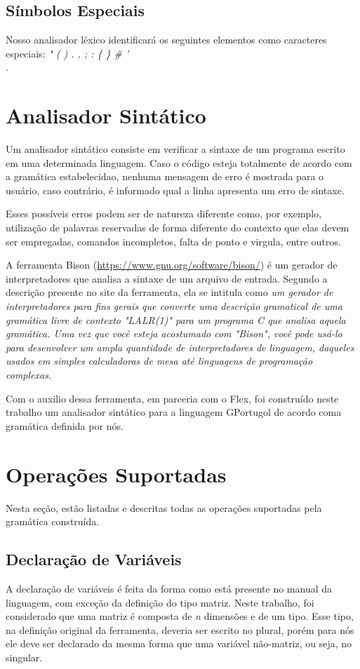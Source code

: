 \documentclass[
12pt,				%
a4paper,			%
english,			%
french,				%
spanish,			%
brazil,				%
article
]{abntex2}
\begin{document}
\subsection{Símbolos Especiais}
Nosso analisador léxico identificará os seguintes elementos como caracteres especiais: \textit{" ( ) . , ; : \{ \} \# ' \\}.


\section{Analisador Sintático}

Um analisador sintático consiste em verificar a sintaxe de um programa escrito em uma determinada linguagem. Caso o código esteja totalmente de acordo com a gramática estabelecidao, nenhuma mensagem de erro é mostrada para o usuário, caso contrário, é informado qual a linha apresenta um erro de sintaxe.

Esses possíveis erros podem ser de natureza diferente como, por exemplo, utilização de palavras reservadas de forma diferente do contexto que elas devem ser empregadas, comandos incompletos, falta de ponto e virgula, entre outros. 

A ferramenta Bison (\url{https://www.gnu.org/software/bison/}) é um gerador de interpretadores que analisa a sintaxe de um arquivo de entrada. Segundo a descrição presente no site da ferramenta, ela se intitula como \textit{um gerador de interpretadores para fins gerais que converte uma descrição gramatical de uma gramática livre de contexto "LALR(1)" para um programa C que analisa aquela gramática. Uma vez que você esteja acostumado com "Bison", você pode usá-lo para desenvolver um ampla quantidade de interpretadores de linguagem, daqueles usados em simples calculadoras de mesa até linguagens de programação complexas.}

Com o auxilio dessa ferramenta, em parceria com o Flex, foi construído neste trabalho um analisador sintático para a linguagem GPortugol de acordo coma  gramática definida por nós.


\section{Operações Suportadas}
Nesta seção, estão listadas e descritas todas as operações suportadas pela gramática construída.
\subsection{Declaração de Variáveis}
A declaração de variáveis é feita da forma como está presente no manual da linguagem, com exceção da definição do tipo matriz. Neste trabalho, foi considerado que uma matriz é composta de \textit{n} dimensões e de um tipo. Esse tipo, na definição original da ferramenta, deveria ser escrito no plural, porém para nós ele deve ser declarado da mesma forma que uma variável não-matriz, ou seja, no singular.
\end{document}
